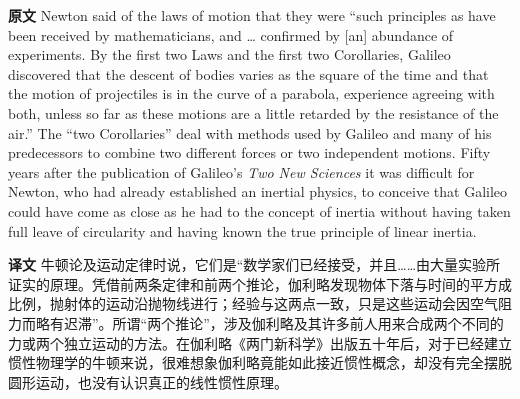 \documentclass[UTF8,zihao=-4]{ctexart}
\begin{document}
\noindent\textbf{原文} Newton said of the laws of motion that they were ``such principles as have been received by mathematicians, and \ldots{} confirmed by [an] abundance of experiments. By the first two Laws and the first two Corollaries, Galileo discovered that the descent of bodies varies as the square of the time and that the motion of projectiles is in the curve of a parabola, experience agreeing with both, unless so far as these motions are a little retarded by the resistance of the air.'' The ``two Corollaries'' deal with methods used by Galileo and many of his predecessors to combine two different forces or two independent motions. Fifty years after the publication of Galileo's \emph{Two New Sciences} it was difficult for Newton, who had already established an inertial physics, to conceive that Galileo could have come as close as he had to the concept of inertia without having taken full leave of circularity and having known the true principle of linear inertia.
\par\noindent\textbf{译文} 牛顿论及运动定律时说，它们是“数学家们已经接受，并且……由大量实验所证实的原理。凭借前两条定律和前两个推论，伽利略发现物体下落与时间的平方成比例，抛射体的运动沿抛物线进行；经验与这两点一致，只是这些运动会因空气阻力而略有迟滞”。所谓“两个推论”，涉及伽利略及其许多前人用来合成两个不同的力或两个独立运动的方法。在伽利略《两门新科学》出版五十年后，对于已经建立惯性物理学的牛顿来说，很难想象伽利略竟能如此接近惯性概念，却没有完全摆脱圆形运动，也没有认识真正的线性惯性原理。
\medskip
\end{document}
